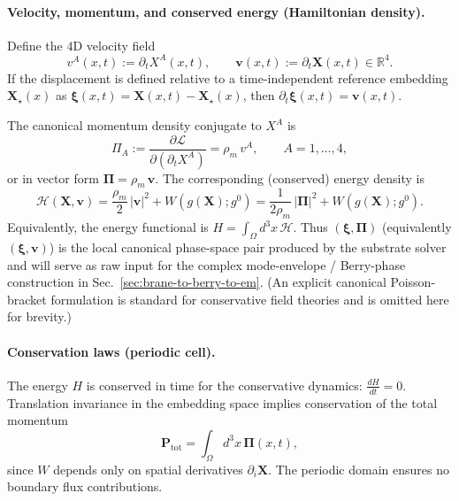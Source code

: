 \paragraph{Velocity, momentum, and conserved energy (Hamiltonian density).}
Define the $4$D velocity field
\begin{equation}
  v^A(x,t) := \partial_t X^A(x,t),
  \qquad
  \mathbf v(x,t) := \partial_t \mathbf X(x,t)\in\mathbb R^4.
  \label{eq:velocity-field}
\end{equation}
If the displacement is defined relative to a time-independent reference embedding
$\mathbf X_\star(x)$ as $\boldsymbol\xi(x,t)=\mathbf X(x,t)-\mathbf X_\star(x)$, then
$\partial_t\boldsymbol\xi(x,t)=\mathbf v(x,t)$.

The canonical momentum density conjugate to $X^A$ is
\begin{equation}
  \Pi_A := \frac{\partial \mathcal L}{\partial(\partial_t X^A)}
  = \rho_m\,v^A,
  \qquad A=1,\dots,4,
  \label{eq:canonical-momentum}
\end{equation}
or in vector form $\boldsymbol\Pi=\rho_m\,\mathbf v$.
The corresponding (conserved) energy density is
\begin{equation}
  \mathcal H(\mathbf X,\mathbf v)
  = \frac{\rho_m}{2}\,|\mathbf v|^2 + W(g(\mathbf X);g^0)
  = \frac{1}{2\rho_m}\,|\boldsymbol\Pi|^2 + W(g(\mathbf X);g^0).
  \label{eq:brane-hamiltonian-density}
\end{equation}
Equivalently, the energy functional is $H=\int_\Omega d^3x\,\mathcal H$.
Thus $(\boldsymbol\xi,\boldsymbol\Pi)$ (equivalently $(\boldsymbol\xi,\mathbf v)$)
is the local canonical phase-space pair produced by the substrate solver and will
serve as raw input for the complex mode-envelope / Berry-phase construction in
Sec.~\ref{sec:brane-to-berry-to-em}.
(An explicit canonical Poisson-bracket formulation is standard for conservative
field theories and is omitted here for brevity.)

\paragraph{Conservation laws (periodic cell).}
The energy $H$ is conserved in time for the conservative dynamics: $\frac{dH}{dt}=0$.
Translation invariance in the embedding space implies conservation of the total momentum
\begin{equation}
  \mathbf P_{\text{tot}} = \int_{\Omega} d^3x\, \boldsymbol\Pi(x,t),
  \label{eq:total-momentum}
\end{equation}
since $W$ depends only on spatial derivatives $\partial_i\mathbf X$.
The periodic domain ensures no boundary flux contributions.

